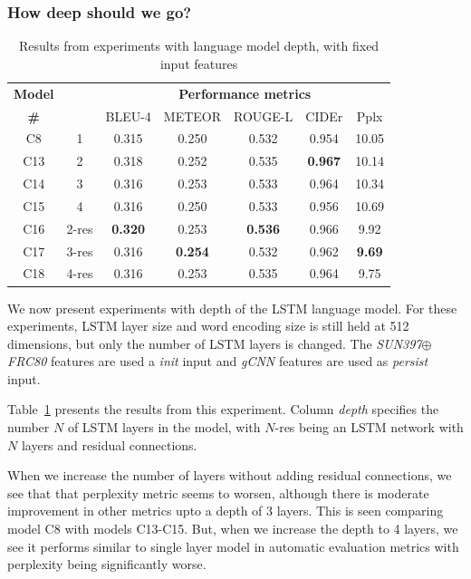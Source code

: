 \subsubsection{How deep should we go?}
\begin{table}[htp]
  \centering
  \newcommand{\bs}{\small}
  \begin{adjustbox}{center}
  \begin{tabular}{|c|c|c|c|c|c|c|}
    \hline
    \bf Model & \bf \multirow{2}{*}{Depth} & \multicolumn{5}{c|}{\bf Performance metrics}\\
    \cline{3-7}
    \bf \# &\bf &\bs BLEU-4 &\bs METEOR &\bs ROUGE-L &\bs CIDEr&\bs Pplx \\\hline
    C8  & 1   & 0.315 & 0.250 & 0.532 & 0.954 &10.05  \\\hline
    C13 & 2   & 0.318 & 0.252 & 0.535 &\bf0.967 & 10.14  \\
    C14 & 3   & 0.316 & 0.253 & 0.533 & 0.964   & 10.34  \\
    C15 & 4   & 0.316 & 0.250 & 0.533 & 0.956 & 10.69  \\\hline
    C16 &2-res&\bf0.320& 0.253 &\bf0.536&0.966  & 9.92   \\
    C17 &3-res& 0.316 &\bf0.254&0.532 & 0.962   &\bf9.69 \\
    C18 &4-res& 0.316 & 0.253 & 0.535 & 0.964   & 9.75 \\\hline
  \end{tabular}
  \end{adjustbox}
  \caption{Results from experiments with language model depth, with fixed input features}
  \label{tab:resCocDepthExpt}
\end{table}

We now present experiments with depth of the LSTM language model.
For these experiments, LSTM layer size and word encoding size is still held at
512 dimensions, but only the number of LSTM layers is changed.
The \emph{SUN397$\oplus$FRC80} features are used a \emph{init} input and
\emph{gCNN} features are used as \emph{persist} input.

Table~\ref{tab:resCocDepthExpt} presents the results from this experiment.
Column \emph{depth} specifies the number $N$ of LSTM layers in the model,
with $N$-res being an LSTM network with $N$ layers and residual connections.

When we increase the number of layers without adding residual connections, we
see that that perplexity metric seems to worsen, although there is moderate
improvement in other metrics upto a depth of 3 layers.
This is seen comparing model C8 with models C13-C15.
But, when we increase the depth to 4 layers, we see it performs similar to
single layer model in automatic evaluation metrics with perplexity being
significantly worse.

